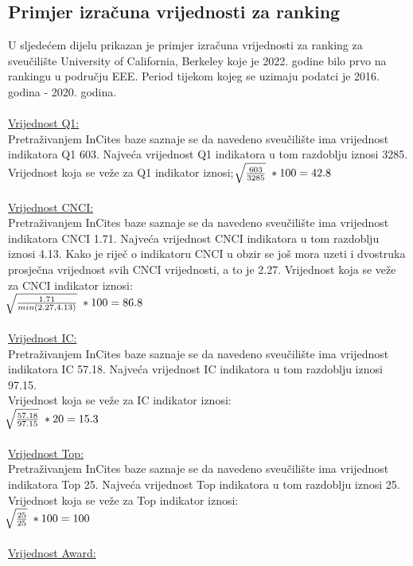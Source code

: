 \documentclass[times, utf8, zavrsni]{fer}
\begin{document}
\subsection{Primjer izračuna vrijednosti za ranking}
\label{racunanje}
U sljedećem dijelu prikazan je primjer izračuna vrijednosti za ranking za sveučilište University of California, Berkeley koje je 2022. godine bilo prvo na rankingu u području EEE.
Period tijekom kojeg se uzimaju podatci je 2016. godina - 2020. godina.
\\
\\ \underline{Vrijednost Q1:} 
\\ Pretraživanjem InCites baze saznaje se da navedeno sveučilište ima vrijednost indikatora Q1 603. Najveća vrijednost Q1 indikatora u tom razdoblju iznosi 3285.
Vrijednost koja se veže za Q1 indikator iznosi;  \; $\sqrt[\leftroot{-2}]{\frac{603}{3285}} \; * 100 = 42.8$
\\
\\ \underline{Vrijednost CNCI:} 
\\ Pretraživanjem InCites baze saznaje se da navedeno sveučilište ima vrijednost indikatora CNCI 1.71. Najveća vrijednost CNCI indikatora u tom razdoblju iznosi 4.13.
Kako je riječ o indikatoru CNCI u obzir se još mora uzeti i dvostruka prosječna vrijednost svih CNCI vrijednosti, a to je 2.27.
Vrijednost koja se veže za CNCI indikator iznosi: \; \\ $\sqrt[\leftroot{-2}]{\frac{1.71}{min(2.27, 4.13)}} \; * 100 = 86.8$
\\
\\ \underline{Vrijednost IC:} 
\\ Pretraživanjem InCites baze saznaje se da navedeno sveučilište ima vrijednost indikatora IC 57.18. Najveća vrijednost IC indikatora u tom razdoblju iznosi 97.15.
\\Vrijednost koja se veže za IC indikator iznosi: \; \\ $\sqrt[\leftroot{-2}]{\frac{57.18}{97.15}} \; * 20 = 15.3$
\\
\\ \underline{Vrijednost Top:} 
\\ Pretraživanjem InCites baze saznaje se da navedeno sveučilište ima vrijednost indikatora Top 25. Najveća vrijednost Top indikatora u tom razdoblju iznosi 25.
Vrijednost koja se veže za Top indikator iznosi: \; \\ $\sqrt[\leftroot{-2}]{\frac{25}{25}} \; * 100 = 100$
\\
\\ \underline{Vrijednost Award:} 
\end{document}
